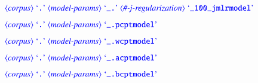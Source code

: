 \documentclass[12pt]{report}
\def\blue{\color{blue}}
\begin{document}
$\dtype{corpus} \ \dcode{.} \ \dtype{model-params} \ \dcode{\_.} \ \dtype{\#-j-regularization} \ \dcode{\_100\_jmlrmodel}$

$\dtype{corpus} \ \dcode{.} \ \dtype{model-params} \ \dcode{\_.pcptmodel}$

$\dtype{corpus} \ \dcode{.} \ \dtype{model-params} \ \dcode{\_.wcptmodel}$

$\dtype{corpus} \ \dcode{.} \ \dtype{model-params} \ \dcode{\_.acptmodel}$

$\dtype{corpus} \ \dcode{.} \ \dtype{model-params} \ \dcode{\_.bcptmodel}$




%
%
%
%
%
%
%
%
%
%
%


\end{document}
